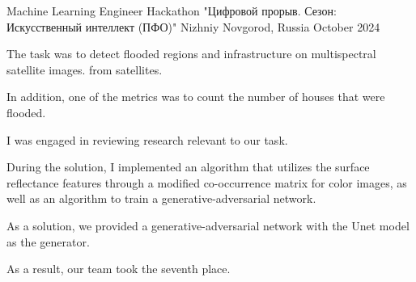 \begin{cventries}
{\begin{cvitems}
  \end{cvitems}
}
\cventry
{Machine Learning Engineer} %
{Hackathon "Цифровой прорыв. Сезон: Искусственный интеллект (ПФО)"} %
{Nizhniy Novgorod, Russia} %
{October 2024} %
{
  \begin{cvitems} %
    \item {The task was to detect flooded regions and infrastructure on multispectral satellite images. from satellites. }
    \item {In addition, one of the metrics was to count the number of houses that were flooded. }
    \item {I was engaged in reviewing research relevant to our task. } 
    \item {During the solution, I implemented an algorithm that utilizes the surface reflectance features through a modified co-occurrence matrix for color images, as well as an algorithm to train a generative-adversarial network. }
    \item {As a solution, we provided a generative-adversarial network with the Unet model as the generator. } 
    \item {As a result, our team took the seventh place.}
  \end{cvitems}
}
\end{cventries}
